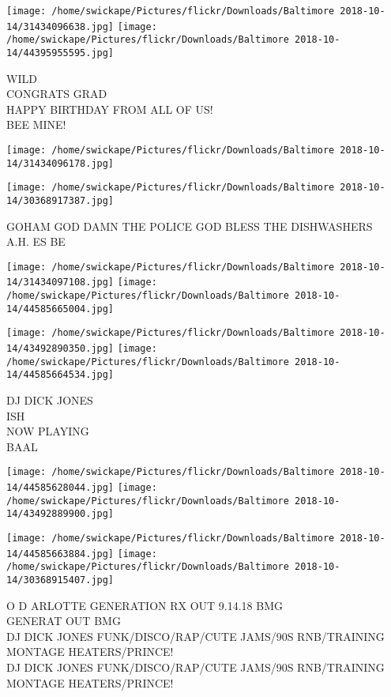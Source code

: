 \documentclass[10pt,letterpaper]{article}
\begin{document}
\texttt{[image: /home/swickape/Pictures/flickr/Downloads/Baltimore 2018-10-14/31434096638.jpg]}
\texttt{[image: /home/swickape/Pictures/flickr/Downloads/Baltimore 2018-10-14/44395955595.jpg]}

WILD\\
CONGRATS GRAD\\
HAPPY BIRTHDAY FROM ALL OF US!\\
BEE MINE!\\
\pagebreak

\texttt{[image: /home/swickape/Pictures/flickr/Downloads/Baltimore 2018-10-14/31434096178.jpg]}

\vspace{0.25in}
\texttt{[image: /home/swickape/Pictures/flickr/Downloads/Baltimore 2018-10-14/30368917387.jpg]}

GOHAM GOD DAMN THE POLICE GOD BLESS THE DISHWASHERS\\
A.H. ES BE\\
\pagebreak

\texttt{[image: /home/swickape/Pictures/flickr/Downloads/Baltimore 2018-10-14/31434097108.jpg]}
\texttt{[image: /home/swickape/Pictures/flickr/Downloads/Baltimore 2018-10-14/44585665004.jpg]}

\texttt{[image: /home/swickape/Pictures/flickr/Downloads/Baltimore 2018-10-14/43492890350.jpg]}
\texttt{[image: /home/swickape/Pictures/flickr/Downloads/Baltimore 2018-10-14/44585664534.jpg]}

DJ DICK JONES\\
ISH\\
NOW PLAYING\\
BAAL\\
\pagebreak

\texttt{[image: /home/swickape/Pictures/flickr/Downloads/Baltimore 2018-10-14/44585628044.jpg]}
\texttt{[image: /home/swickape/Pictures/flickr/Downloads/Baltimore 2018-10-14/43492889900.jpg]}

\texttt{[image: /home/swickape/Pictures/flickr/Downloads/Baltimore 2018-10-14/44585663884.jpg]}
\texttt{[image: /home/swickape/Pictures/flickr/Downloads/Baltimore 2018-10-14/30368915407.jpg]}

O D ARLOTTE GENERATION RX OUT 9.14.18 BMG\\
GENERAT OUT BMG\\
DJ DICK JONES FUNK/DISCO/RAP/CUTE JAMS/90S RNB/TRAINING MONTAGE HEATERS/PRINCE!\\
DJ DICK JONES FUNK/DISCO/RAP/CUTE JAMS/90S RNB/TRAINING MONTAGE HEATERS/PRINCE!\\
\pagebreak
\end{document}

